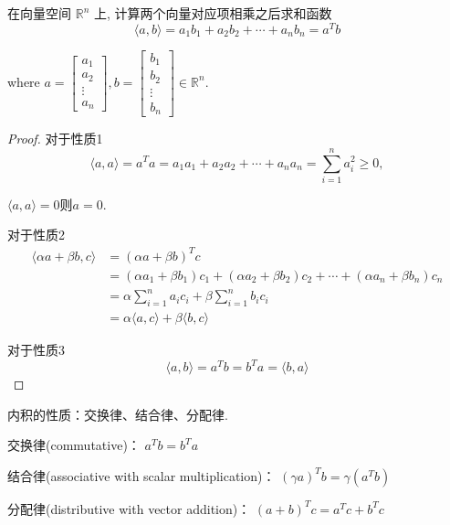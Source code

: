 \begin{example}
    在向量空间 \( \mathbb{R}^{n} \) 上,  计算两个向量对应项相乘之后求和函数
    $$ \langle a, b\rangle=a_{1} b_{1}+a_{2} b_{2}+\cdots+a_{n} b_{n}=a^{T}{b} $$

where \( a=\left[\begin{array}{c}a_{1} \\ a_{2} \\ \vdots \\ a_{n}\end{array}\right], b=\left[\begin{array}{c}b_{1} \\ b_{2} \\ \vdots \\ b_{n}\end{array}\right] \in \mathbb{R}^{n} \).
\end{example}

\begin{proof}
对于性质1
    $$\langle a, a\rangle=a^T a=a_{1} a_{1}+a_{2} a_{2}+\cdots+a_{n} a_{n}=\sum_{i=1}^{n} a_{i}^{2} \geq 0,$$

    $\langle a, a\rangle=0 则 a=0$.

    对于性质2
    $$\begin{aligned} \langle\alpha a+\beta {b}, {c}\rangle 
    & = (\alpha a+\beta {b})^T c 
    \\ &=\left(\alpha a_{1}+\beta b_{1}\right) c_{1}+\left(\alpha a_{2}+\beta b_{2}\right) c_{2}+\cdots+\left(\alpha a_{n}+\beta b_{n}\right) c_{n} 
    \\ &=\alpha \sum_{i=1}^{n} a_{i} c_{i}+\beta \sum_{i=1}^{n} b_{i} c_{i}
    \\ &=\alpha\langle a, c\rangle+\beta\langle b, c\rangle\end{aligned} $$

    对于性质3
    $$ \langle a, b\rangle=a^{{T}} b=b^{{T}} a=\langle b, a\rangle $$
\end{proof}

\begin{theorem}
    内积的性质：交换律、结合律、分配律. 

交换律(commutative)： \( a^{T} b=b^{T} a \)

结合律(associative with scalar multiplication)： \( (\gamma a)^{T} b=\gamma\left(a^{T} b\right) \)

分配律(distributive with vector addition)： \( (a+b)^{T} c=a^{T} c+b^{T} c \)
\end{theorem}



